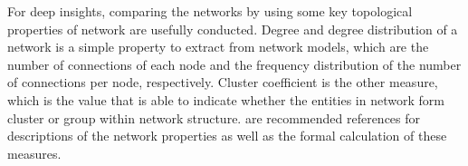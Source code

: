 For deep insights, comparing the networks by using some key topological properties of network are usefully conducted. Degree and degree distribution of a network is a simple property to extract from network models, which are the number of connections of each node and the frequency distribution of the number of connections per node, respectively. Cluster coefficient is the other measure, which is the value that is able to indicate whether the entities in network form cluster or group within network structure.  are recommended references for descriptions of the network properties as well as the formal calculation of these measures.








